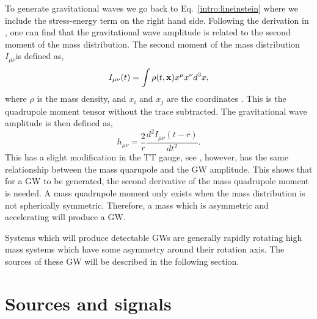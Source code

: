 To generate gravitational waves we go back to Eq.~\ref{intro:lineinstein} where we include the stress-energy term on the right hand side.
Following the derivation in \citep{flanagan2005BasicsGravitational}, one can find that the gravitational wave amplitude is related to the second moment of the mass distribution.
The second moment of the mass distribution $I_{\mu\nu}$is defined as,
\begin{equation}
    I_{\mu \nu}(t) = \int \rho(t,{\bf x}) x^\mu x^\nu d^3x,
\end{equation}
where $\rho$ is the mass density, and $x_i$ and $x_j$ are the coordinates \citep{flanagan2005BasicsGravitational}. 
This is the quadrupole moment tensor without the trace subtracted.
The gravitational wave amplitude is then defined as,
\begin{equation}
\label{intro:gravwave:amp}
    h_{\mu \nu} = \frac{2}{r}  \frac{d^2 I_{\mu \nu}(t-r)}{dt^2}.
\end{equation}
This has a slight modification in the TT gauge, see \citep{flanagan2005BasicsGravitational}, however, has the same relationship between the mass quarupole and the \ac{GW} amplitude.
This shows that for a \ac{GW} to be generated, the second derivative of the mass quadrupole moment is needed.
A mass quadrupole moment only exists when the mass distribution is not spherically symmetric.
Therefore, a mass which is asymmetric and accelerating will produce a \ac{GW}.

Systems which will produce detectable \acp{GW} are generally rapidly rotating high mass systems which have some asymmetry around their rotation axis.
The sources of these \ac{GW} will be described in the following section.



\section{\label{intro:sources}Sources and signals}

